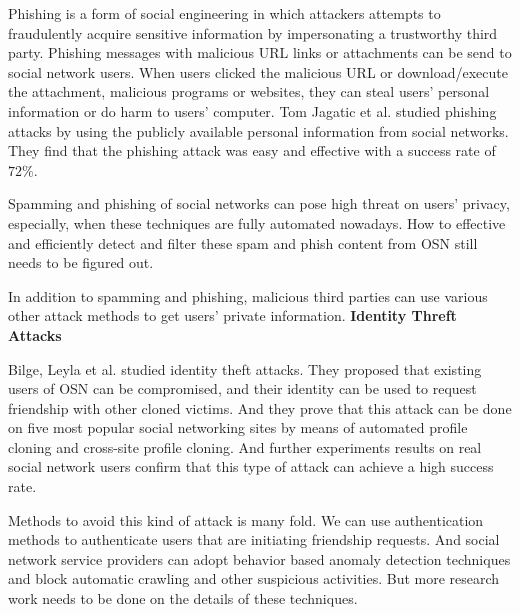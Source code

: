 \documentclass[12pt]{article}
\begin{document}

Phishing is a form of social engineering in which attackers attempts
to fraudulently acquire sensitive information by impersonating a
trustworthy third party. Phishing messages with malicious URL links or
attachments can be send to social network users. When users clicked
the malicious URL or download/execute the attachment, malicious
programs or websites, they can steal users' personal information or do
harm to users' computer. Tom Jagatic et al. \cite{social-phishing}
studied phishing attacks by using the publicly available personal
information from social networks. They find that the phishing attack
was easy and effective with a success rate of $72\%$.

Spamming and phishing of social networks can pose high threat on
users' privacy, especially, when these techniques are fully automated 
nowadays\cite{SN-automated-cheap-spam}\cite{SN-explore-spam}. How to
effective and efficiently detect and filter these spam and phish
content from OSN still needs to be figured out.

In addition to spamming and phishing, malicious third parties can use
various other attack methods to get users' private information. 
\textbf{Identity Threft Attacks}

Bilge, Leyla et al.\cite{identity-theft-attack} studied identity
theft attacks. They proposed that existing users of OSN can be
compromised, and their identity can be used to request friendship with
other cloned victims. And they prove that this attack can be done on
five most popular social networking sites by means of automated
profile cloning and cross-site profile cloning. And further experiments
results on real social network users confirm that this type of attack
can achieve a high success rate. 

Methods to avoid this kind of attack is many fold. We can use
authentication methods to authenticate users that are initiating
friendship requests. And social network service providers 
can adopt behavior based anomaly detection techniques and block
automatic crawling and other suspicious activities. But more research
work needs to be done on the details of these techniques. 
\end{document}
